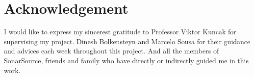\section*{Acknowledgement}
\label{sec:acknowledgements}

I would like to express my sincerest gratitude to Professor Viktor Kuncak for supervising my project.
\newline
\newline
Dinesh Bolkensteyn and Marcelo Sousa for their guidance and advices each week throughout this project.
\newline
\newline
And all the members of SonarSource, friends and family who have directly or indirectly guided me in this work.